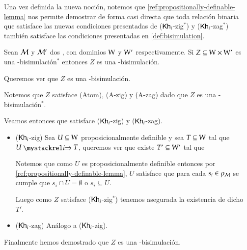 Una vez definida la nueva noción, notemos que \ref{ref:propositionally-definable-lemma} nos permite demostrar de forma casi directa que
toda relación binaria que satisface las nuevas condiciones presentadas de ($\mathsf{Kh}_i$-zig$^*$) y ($\mathsf{Kh}_i$-zag$^*$) también satisface las condiciones
presentadas en \ref{def:bisimulation}.

\begin{lema}\label{ref:new_bisim-implies-old_bisim}
    Sean $\mathcal{M}$ y $\mathcal{M}'$ dos \ultss, con dominios $\mathrm{W}$ y $\mathrm{W}'$ respectivamente. Si $Z \subseteq \mathrm{W} \times \mathrm{W}'$ es una \KHilogic-bisimulación$^*$ entonces $Z$ es una \KHilogic-bisimulación.
\end{lema}

\begin{demostracion}
    Queremos ver que $Z$ es una \KHilogic-bisimulación.

    Notemos que $Z$ satisface (Atom), (A-zig) y (A-zag) dado que $Z$ es una \KHilogic-bisimulación$^*$.

    Veamos entonces que satisface ($\mathsf{Kh}_i$-zig) y ($\mathsf{Kh}_i$-zag).

    \begin{itemize}
        \item ($\mathsf{Kh}_i$-zig) Sea $U \subseteq \mathrm{W}$ proposicionalmente definible y sea $T \subseteq \mathrm{W}$ tal que $U \ultsExecAgi T$, queremos ver que existe
        $T' \subseteq \mathrm{W}'$ tal que

        \begin{multicols}{2}
        \end{multicols}
        Notemos que como $U$ es proposicionalmente definible entonces por \ref{ref:propositionally-definable-lemma}, $U$ satisface que para cada $s_i \in \rho_{\mathcal{M}}$ se cumple
        que $s_i \cap U = \emptyset$ o $s_i \subseteq U$.
    
        Luego como $Z$ satisface ($\mathsf{Kh}_i$-zig$^*$) tenemos asegurada la existencia de dicho $T'$.
    
        \item ($\mathsf{Kh}_i$-zag) Análogo a ($\mathsf{Kh}_i$-zig).
    \end{itemize}

    Finalmente hemos demostrado que $Z$ es una \KHilogic-bisimulación.
\end{demostracion}

